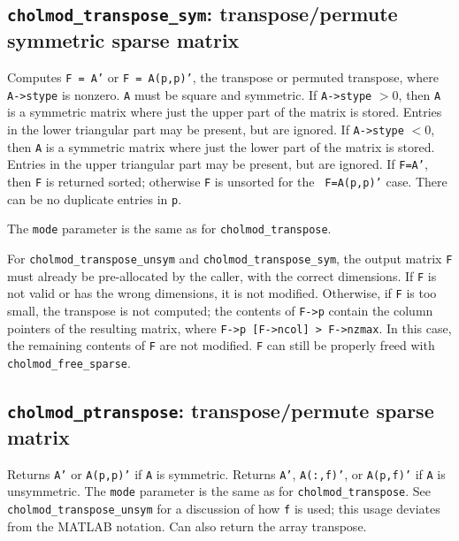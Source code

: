 \documentclass[11pt]{article}
\begin{document}
\subsection{{\tt cholmod\_transpose\_sym}: transpose/permute symmetric sparse
matrix}


Computes {\tt F = A'} or {\tt F = A(p,p)'}, the transpose or permuted
transpose, where {\tt A->stype} is nonzero.  {\tt A} must be square and
symmetric.  If {\tt A->stype} $> 0$, then {\tt A} is a symmetric matrix where
just the upper part of the matrix is stored.  Entries in the lower triangular
part may be present, but are ignored.  If {\tt A->stype} $< 0$, then {\tt A} is
a symmetric matrix where just the lower part of the matrix is stored.  Entries
in the upper triangular part may be present, but are ignored.  If {\tt F=A'},
then {\tt F} is returned sorted; otherwise {\tt F} is unsorted for the {\tt
F=A(p,p)'} case.  There can be no duplicate entries in {\tt p}.

The \verb'mode' parameter is the same as for \verb'cholmod_transpose'.

For {\tt cholmod\_transpose\_unsym} and {\tt cholmod\_transpose\_sym}, the
output matrix {\tt F} must already be pre-allocated by the caller, with the
correct dimensions.  If {\tt F} is not valid or has the wrong dimensions, it is
not modified.  Otherwise, if {\tt F} is too small, the transpose is not
computed; the contents of {\tt F->p} contain the column pointers of the
resulting matrix, where {\tt F->p [F->ncol] > F->nzmax}.  In this case, the
remaining contents of {\tt F} are not modified.  {\tt F} can still be properly
freed with {\tt cholmod\_free\_sparse}.

\subsection{{\tt cholmod\_ptranspose}: transpose/permute sparse matrix}


Returns {\tt A'} or {\tt A(p,p)'} if {\tt A} is symmetric.
Returns {\tt A'}, {\tt A(:,f)'}, or {\tt A(p,f)'} if {\tt A} is unsymmetric.
The \verb'mode' parameter is the same as for \verb'cholmod_transpose'.
See {\tt cholmod\_transpose\_unsym} for a discussion of how {\tt f} is used;
this usage deviates from the MATLAB notation.
Can also return the array transpose.

\end{document}
